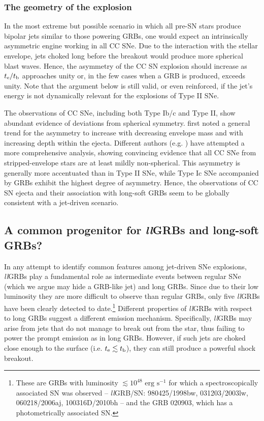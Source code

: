 \documentclass[useAMS,usenatbib]{mn2e}
\begin{document}
\subsubsection{The geometry of the explosion}

In the most extreme but possible scenario in which all pre-SN stars produce bipolar jets similar to those powering GRBs, one would expect an intrinsically asymmetric engine working in all CC SNe. Due to the interaction with the stellar envelope, jets choked long before the breakout would produce more spherical blast waves. Hence, the asymmetry of the CC SN explosion should increase as $t_{\rm e}/t_{\rm b}$ approaches unity or, in the few cases when a GRB is produced, exceeds unity. Note that the argument below is still valid, or even reinforced, if the jet's energy is not dynamically relevant for the explosions of Type II SNe.

The observations of CC SNe, including both Type Ib/c and Type II, show abundant evidence of deviations from spherical symmetry. \citet{Wang2001} first noted a general trend for the asymmetry to increase with decreasing envelope mass and with increasing depth within the ejecta. Different authors (e.g. \citealt{Maeda2008, Modjaz2008, WangWheeler2008, Taubenberger2009,Cano2016}) have attempted a more comprehensive analysis, showing convincing evidence that all CC SNe from stripped-envelope stars are at least mildly non-spherical. This asymmetry is generally more accentuated than in Type II SNe, while Type Ic SNe accompanied by GRBs exhibit the highest degree of asymmetry. Hence, the observations of CC SN ejecta and their association with long-soft GRBs seem to be globally consistent with a jet-driven scenario.


\subsection{A common progenitor for {\it ll}GRBs and long-soft GRBs?}
\label{sec:dis}

In any attempt to identify common features among jet-driven SNe explosions, {\it ll}GRBs play a fundamental role as intermediate events between regular SNe (which we argue may hide a GRB-like jet) and long GRBs. Since due to their low luminosity they are more difficult to observe than regular GRBs, only five {\it ll}GRBs have been clearly detected to date.\footnote{These are GRBs with luminosity $\lesssim 10^{48}\text{ erg s$^{-1}$}$ for which a spectroscopically associated SN was observed -- {\it ll}GRB/SN: 980425/1998bw, 031203/2003lw, 060218/2006aj, 100316D/2010bh -- and the GRB 020903, which has a photometrically associated SN.} Different properties of {\it ll}GRBs with respect to long GRBs suggest a different emission mechanism. Specifically, {\it ll}GRBs may arise from jets that do not manage to break out from the star, thus failing to power the prompt emission as in long GRBs. However, if such jets are choked close enough to the surface (i.e. $t_{\rm e}\lesssim t_{\rm b}$), they can still produce a powerful shock breakout.
\end{document}
